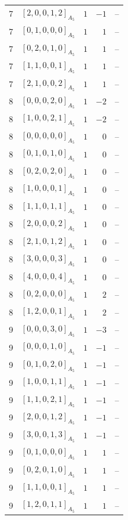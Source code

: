 \documentclass[11pt]{article}
\newcommand{\Dynkin}[1]{#1}
\begin{document}
\begin{longtable}{r l r r l}
7 & $\Dynkin{[2,0,0,1,2]_{A_5}}$ & $1$ & $-1$ & --\\
7 & $\Dynkin{[0,1,0,0,0]_{A_5}}$ & $1$ & $1$ & --\\
7 & $\Dynkin{[0,2,0,1,0]_{A_5}}$ & $1$ & $1$ & --\\
7 & $\Dynkin{[1,1,0,0,1]_{A_5}}$ & $1$ & $1$ & --\\
7 & $\Dynkin{[2,1,0,0,2]_{A_5}}$ & $1$ & $1$ & --\\
8 & $\Dynkin{[0,0,0,2,0]_{A_5}}$ & $1$ & $-2$ & --\\
8 & $\Dynkin{[1,0,0,2,1]_{A_5}}$ & $1$ & $-2$ & --\\
8 & $\Dynkin{[0,0,0,0,0]_{A_5}}$ & $1$ & $0$ & --\\
8 & $\Dynkin{[0,1,0,1,0]_{A_5}}$ & $1$ & $0$ & --\\
8 & $\Dynkin{[0,2,0,2,0]_{A_5}}$ & $1$ & $0$ & --\\
8 & $\Dynkin{[1,0,0,0,1]_{A_5}}$ & $1$ & $0$ & --\\
8 & $\Dynkin{[1,1,0,1,1]_{A_5}}$ & $1$ & $0$ & --\\
8 & $\Dynkin{[2,0,0,0,2]_{A_5}}$ & $1$ & $0$ & --\\
8 & $\Dynkin{[2,1,0,1,2]_{A_5}}$ & $1$ & $0$ & --\\
8 & $\Dynkin{[3,0,0,0,3]_{A_5}}$ & $1$ & $0$ & --\\
8 & $\Dynkin{[4,0,0,0,4]_{A_5}}$ & $1$ & $0$ & --\\
8 & $\Dynkin{[0,2,0,0,0]_{A_5}}$ & $1$ & $2$ & --\\
8 & $\Dynkin{[1,2,0,0,1]_{A_5}}$ & $1$ & $2$ & --\\
9 & $\Dynkin{[0,0,0,3,0]_{A_5}}$ & $1$ & $-3$ & --\\
9 & $\Dynkin{[0,0,0,1,0]_{A_5}}$ & $1$ & $-1$ & --\\
9 & $\Dynkin{[0,1,0,2,0]_{A_5}}$ & $1$ & $-1$ & --\\
9 & $\Dynkin{[1,0,0,1,1]_{A_5}}$ & $1$ & $-1$ & --\\
9 & $\Dynkin{[1,1,0,2,1]_{A_5}}$ & $1$ & $-1$ & --\\
9 & $\Dynkin{[2,0,0,1,2]_{A_5}}$ & $1$ & $-1$ & --\\
9 & $\Dynkin{[3,0,0,1,3]_{A_5}}$ & $1$ & $-1$ & --\\
9 & $\Dynkin{[0,1,0,0,0]_{A_5}}$ & $1$ & $1$ & --\\
9 & $\Dynkin{[0,2,0,1,0]_{A_5}}$ & $1$ & $1$ & --\\
9 & $\Dynkin{[1,1,0,0,1]_{A_5}}$ & $1$ & $1$ & --\\
9 & $\Dynkin{[1,2,0,1,1]_{A_5}}$ & $1$ & $1$ & --\\

\end{longtable}
\end{document}
